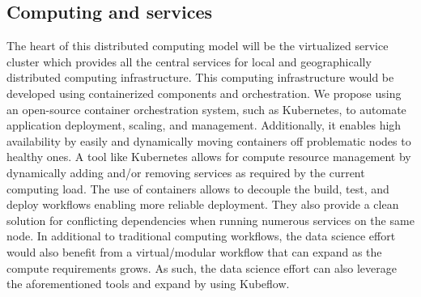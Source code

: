 \subsection{Computing and services}
The heart of this distributed computing model will be the virtualized service cluster which provides all the central services for local and geographically distributed computing infrastructure. This computing infrastructure would be developed using containerized components and orchestration. We propose using an open-source container orchestration system, such as  Kubernetes, to automate application deployment, scaling, and management. %
Additionally, it enables high availability by easily and dynamically moving containers off problematic nodes to healthy ones. A tool like Kubernetes allows for compute resource management by dynamically adding and/or removing services as required by the current computing load. The use of containers allows to decouple the build, test, and deploy workflows enabling more reliable deployment. They also provide a clean solution for conflicting dependencies when running numerous services on the same node. 
In additional to traditional computing workflows, the data science effort would also benefit from a virtual/modular workflow that can expand as the compute requirements grows. As such, the data science effort can also leverage the aforementioned tools and expand by using Kubeflow.

